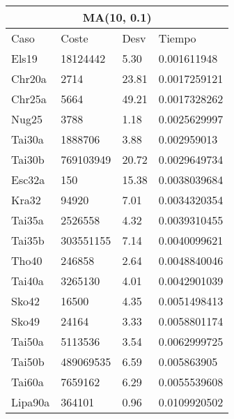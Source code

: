 \documentclass[twoside]{article}
\begin{document}
\begin{table}[h]
\centering
    \begin{tabular}{llll}
    \hline
    \multicolumn{4}{c}{MA(10, 0.1)} \\
    \toprule
    Caso               & Coste & Desv & Tiempo \\
    \midrule
Els19&18124442&5.30&0.001611948\\
Chr20a&2714&23.81&0.0017259121\\
Chr25a&5664&49.21&0.0017328262\\
Nug25&3788&1.18&0.0025629997\\
Tai30a&1888706&3.88&0.002959013\\
Tai30b&769103949&20.72&0.0029649734\\
Esc32a&150&15.38&0.0038039684\\
Kra32&94920&7.01&0.0034320354\\
Tai35a&2526558&4.32&0.0039310455\\
Tai35b&303551155&7.14&0.0040099621\\
Tho40&246858&2.64&0.0048840046\\
Tai40a&3265130&4.01&0.0042901039\\
Sko42&16500&4.35&0.0051498413\\
Sko49&24164&3.33&0.0058801174\\
Tai50a&5113536&3.54&0.0062999725\\
Tai50b&489069535&6.59&0.005863905\\
Tai60a&7659162&6.29&0.0055539608\\
Lipa90a&364101&0.96&0.0109920502\\
    \bottomrule
    \end{tabular}
    \caption{}
\end{table}
\end{document}

